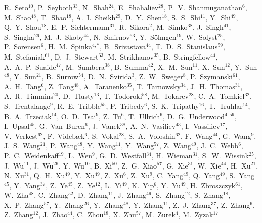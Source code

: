 {R.~Seto$^{10}$,
P.~Seyboth$^{33}$,
N.~Shah$^{24}$,
E.~Shahaliev$^{28}$,
P.~V.~Shanmuganathan$^{6}$,
M.~Shao$^{48}$,
T.~Shao$^{18}$,
A.~I.~Sheikh$^{29}$,
D.~Y.~Shen$^{18}$,
S.~S.~Shi$^{11}$,
Y.~Shi$^{49}$,
Q.~Y.~Shou$^{18}$,
E.~P.~Sichtermann$^{31}$,
R.~Sikora$^{2}$,
M.~Simko$^{38}$,
J.~Singh$^{41}$,
S.~Singha$^{26}$,
M.~J.~Skoby$^{44}$,
N.~Smirnov$^{63}$,
Y.~S\"{o}hngen$^{19}$,
W.~Solyst$^{25}$,
P.~Sorensen$^{6}$,
H.~M.~Spinka$^{4,*}$,
B.~Srivastava$^{44}$,
T.~D.~S.~Stanislaus$^{59}$,
M.~Stefaniak$^{61}$,
D.~J.~Stewart$^{63}$,
M.~Strikhanov$^{35}$,
B.~Stringfellow$^{44}$,
A.~A.~P.~Suaide$^{47}$,
M.~Sumbera$^{38}$,
B.~Summa$^{42}$,
X.~M.~Sun$^{11}$,
X.~Sun$^{12}$,
Y.~Sun$^{48}$,
Y.~Sun$^{21}$,
B.~Surrow$^{54}$,
D.~N.~Svirida$^{3}$,
Z.~W.~Sweger$^{8}$,
P.~Szymanski$^{61}$,
A.~H.~Tang$^{6}$,
Z.~Tang$^{48}$,
A.~Taranenko$^{35}$,
T.~Tarnowsky$^{34}$,
J.~H.~Thomas$^{31}$,
A.~R.~Timmins$^{20}$,
D.~Tlusty$^{13}$,
T.~Todoroki$^{58}$,
M.~Tokarev$^{28}$,
C.~A.~Tomkiel$^{32}$,
S.~Trentalange$^{9}$,
R.~E.~Tribble$^{55}$,
P.~Tribedy$^{6}$,
S.~K.~Tripathy$^{16}$,
T.~Truhlar$^{14}$,
B.~A.~Trzeciak$^{14}$,
O.~D.~Tsai$^{9}$,
Z.~Tu$^{6}$,
T.~Ullrich$^{6}$,
D.~G.~Underwood$^{4,59}$,
I.~Upsal$^{45}$,
G.~Van~Buren$^{6}$,
J.~Vanek$^{38}$,
A.~N.~Vasiliev$^{43}$,
I.~Vassiliev$^{17}$,
V.~Verkest$^{62}$,
F.~Videb{\ae}k$^{6}$,
S.~Vokal$^{28}$,
S.~A.~Voloshin$^{62}$,
F.~Wang$^{44}$,
G.~Wang$^{9}$,
J.~S.~Wang$^{21}$,
P.~Wang$^{48}$,
Y.~Wang$^{11}$,
Y.~Wang$^{57}$,
Z.~Wang$^{49}$,
J.~C.~Webb$^{6}$,
P.~C.~Weidenkaff$^{19}$,
L.~Wen$^{9}$,
G.~D.~Westfall$^{34}$,
H.~Wieman$^{31}$,
S.~W.~Wissink$^{25}$,
J.~Wu$^{11}$,
J.~Wu$^{26}$,
Y.~Wu$^{10}$,
B.~Xi$^{50}$,
Z.~G.~Xiao$^{57}$,
G.~Xie$^{31}$,
W.~Xie$^{44}$,
H.~Xu$^{21}$,
N.~Xu$^{31}$,
Q.~H.~Xu$^{49}$,
Y.~Xu$^{49}$,
Z.~Xu$^{6}$,
Z.~Xu$^{9}$,
C.~Yang$^{49}$,
Q.~Yang$^{49}$,
S.~Yang$^{45}$,
Y.~Yang$^{37}$,
Z.~Ye$^{45}$,
Z.~Ye$^{12}$,
L.~Yi$^{49}$,
K.~Yip$^{6}$,
Y.~Yu$^{49}$,
H.~Zbroszczyk$^{61}$,
W.~Zha$^{48}$,
C.~Zhang$^{52}$,
D.~Zhang$^{11}$,
J.~Zhang$^{49}$,
S.~Zhang$^{12}$,
S.~Zhang$^{18}$,
X.~P.~Zhang$^{57}$,
Y.~Zhang$^{26}$,
Y.~Zhang$^{48}$,
Y.~Zhang$^{11}$,
Z.~J.~Zhang$^{37}$,
Z.~Zhang$^{6}$,
Z.~Zhang$^{12}$,
J.~Zhao$^{44}$,
C.~Zhou$^{18}$,
X.~Zhu$^{57}$,
M.~Zurek$^{4}$,
M.~Zyzak$^{17}$
}

\address{\rm{(STAR Collaboration)}}

